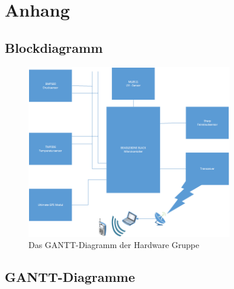 \section{Anhang}

\subsection{Blockdiagramm}
\begin{figure}[htbp]
	\centering
	\includegraphics[width=0.8\textwidth]{8_Anhang/Blockdiagramm.png}
	\caption{Das GANTT-Diagramm der Hardware Gruppe}
	\label{blockdiagramm}
\end{figure}

\newpage
\subsection{GANTT-Diagramme}

